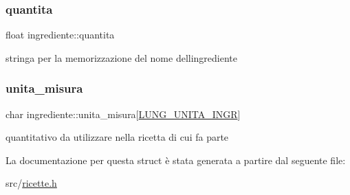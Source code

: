 \mbox{\label{structingrediente_ad790202dff2ec007bdff02bb6d6635b0}} 
\subsubsection{\texorpdfstring{quantita}{quantita}}
{\footnotesize\ttfamily float ingrediente\+::quantita}



stringa per la memorizzazione del nome dell\textquotesingle{}ingrediente 

\mbox{\label{structingrediente_ad56d9ae84adc710b29d7466ba3f39389}} 
\subsubsection{\texorpdfstring{unita\+\_\+misura}{unita\_misura}}
{\footnotesize\ttfamily char ingrediente\+::unita\+\_\+misura\mbox{[}\hyperlink{ricette_8h_a4e785f2d1bf6a16d97c0c9c2393c8545}{L\+U\+N\+G\+\_\+\+U\+N\+I\+T\+A\+\_\+\+I\+N\+GR}\mbox{]}}



quantitativo da utilizzare nella ricetta di cui fa parte 



La documentazione per questa struct è stata generata a partire dal seguente file\+:\begin{DoxyCompactItemize}
\item 
src/\hyperlink{ricette_8h}{ricette.\+h}\end{DoxyCompactItemize}
